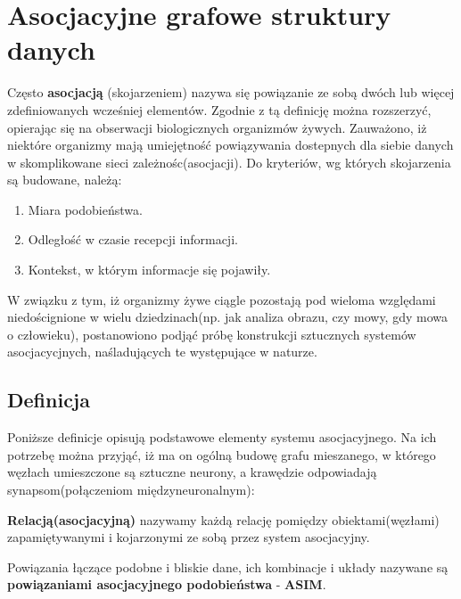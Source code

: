 
\section{Asocjacyjne grafowe struktury danych}
\label{sec:agds}
Często \textbf{asocjacją} (skojarzeniem) nazywa się powiązanie ze sobą dwóch lub więcej zdefiniowanych wcześniej elementów. Zgodnie z \cite[s. 47]{Horzyk} 
tą definicję można rozszerzyć, opierając się na obserwacji biologicznych organizmów żywych. Zauważono, iż niektóre organizmy mają umiejętność
powiązywania dostepnych dla siebie danych w skomplikowane sieci zależnośc(asocjacji). Do kryteriów, wg których skojarzenia są budowane, należą:
\begin{enumerate}
    \item Miara podobieństwa. 
    \item Odległość w czasie recepcji informacji.
    \item Kontekst, w którym informacje się pojawiły.
\end{enumerate}
W związku z tym, iż organizmy żywe ciągle pozostają pod wieloma względami niedoścignione w wielu dziedzinach(np. jak analiza obrazu, czy mowy, gdy mowa o 
człowieku), postanowiono podjąć próbę konstrukcji sztucznych systemów asocjacycjnych, naśladujących te występujące w naturze.

\subsection{Definicja}
\label{subsec:assocDef}

Poniższe definicje \cite[s. 53-56]{Horzyk} opisują podstawowe elementy systemu asocjacyjnego. Na ich potrzebę można przyjąć, iż ma on ogólną budowę grafu mieszanego,
w którego węzłach umieszczone są sztuczne neurony, a krawędzie odpowiadają synapsom(połączeniom międzyneuronalnym):

\begin{definicja}
    \textbf{Relacją(asocjacyjną)} nazywamy każdą relację pomiędzy obiektami(węzłami) zapamiętywanymi i kojarzonymi ze sobą przez system asocjacyjny.
\end{definicja}

\begin{definicja}
    Powiązania łączące podobne i bliskie dane, ich kombinacje i układy nazywane są \textbf{powiązaniami asocjacyjnego podobieństwa} - \textbf{ASIM}.
\end{definicja}

